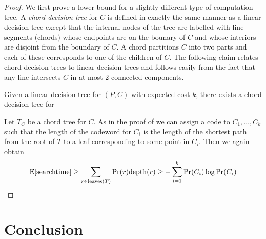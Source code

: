 \documentclass[charterfonts,lotsofwhite]{patmorin}
\begin{document}
\begin{proof} 
We first prove a lower bound for  a slightly different type of
computation tree.  A \emph{chord decision tree} for $C$ is defined in
exactly the same manner as a linear decision tree except that the
internal nodes of the tree are labelled with line segments (chords)
whose endpoints are on the bounary of $C$ and whose interiors are
disjoint from the boundary of $C$.  A chord partitions $C$ into two
parts and each of these corresponds to one of the children of $C$.
The following claim relates chord decision trees to linear decision
trees and follows easily from the fact that any line intersects $C$ in
at most 2 connected components.

\begin{clm}
Given a linear decision tree for $(P,C)$ with expected cost $k$, there exists a
chord decision tree for 
\end{clm}

Let $T_C$ be a chord tree for $C$.
As in the proof of  we can assign a code to
$C_1,\ldots,C_k$ such that the length of the codeword for $C_i$ is the
length of the shortest path from the root of $T$ to a leaf
corresponding to some point in $C_i$.  Then we again obtain
\[
  \mathrm{E}[\mathrm{search time}] 
	\ge \sum_{r\in\mathrm{leaves}(T)} \Pr(r)\mathrm{depth}(r) 
	\ge -\sum_{i=1}^k \Pr(C_i)\log\Pr(C_i)
\]

\end{proof}

\section{Conclusion}
\end{document}
